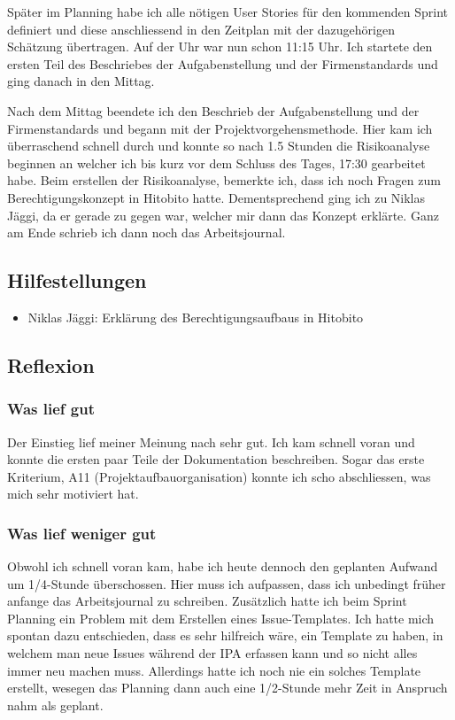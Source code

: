 Später im Planning habe ich alle nötigen User Stories für den kommenden Sprint definiert und diese anschliessend in den Zeitplan mit der dazugehörigen Schätzung übertragen.
Auf der Uhr war nun schon 11:15 Uhr. Ich startete den ersten Teil des Beschriebes der Aufgabenstellung und der Firmenstandards und ging danach in den Mittag.

Nach dem Mittag beendete ich den Beschrieb der Aufgabenstellung und der Firmenstandards und begann mit der Projektvorgehensmethode. Hier kam ich überraschend schnell durch und konnte so
nach 1.5 Stunden die Risikoanalyse beginnen an welcher ich bis kurz vor dem Schluss des Tages, 17:30 gearbeitet habe. Beim erstellen der Risikoanalyse, bemerkte ich, dass ich noch Fragen
zum Berechtigungskonzept in Hitobito hatte. Dementsprechend ging ich zu Niklas Jäggi, da er gerade zu gegen war, welcher mir dann das Konzept erklärte.
Ganz am Ende schrieb ich dann noch das Arbeitsjournal.

\subsection*{Hilfestellungen}
\begin{itemize}
    \item Niklas Jäggi: Erklärung des Berechtigungsaufbaus in Hitobito
\end{itemize}

\subsection*{Reflexion}

\subsubsection*{Was lief gut}
Der Einstieg lief meiner Meinung nach sehr gut. Ich kam schnell voran und konnte die ersten paar Teile der Dokumentation
beschreiben. Sogar das erste Kriterium, A11 (Projektaufbauorganisation) konnte ich scho abschliessen, was mich sehr motiviert hat. 

\subsubsection*{Was lief weniger gut}
Obwohl ich schnell voran kam, habe ich heute dennoch den geplanten Aufwand um 1/4-Stunde überschossen. Hier muss ich aufpassen, dass ich unbedingt früher anfange das
Arbeitsjournal zu schreiben. Zusätzlich hatte ich beim Sprint Planning ein Problem mit dem Erstellen eines Issue-Templates. Ich hatte mich spontan dazu entschieden,
dass es sehr hilfreich wäre, ein Template zu haben, in welchem man neue Issues während der IPA erfassen kann und so nicht alles immer neu machen muss. Allerdings hatte ich noch 
nie ein solches Template erstellt, wesegen das Planning dann auch eine 1/2-Stunde mehr Zeit in Anspruch nahm als geplant.

